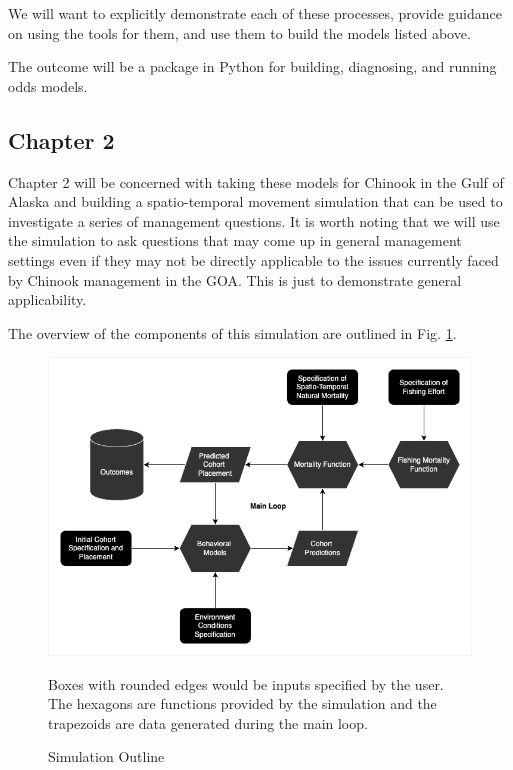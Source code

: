 \documentclass[11pt]{article}
\begin{document}
We will want to explicitly demonstrate each of these processes, provide guidance on using the tools for them, and use them to build the models listed above. \newline

The outcome will be a package in Python for building, diagnosing, and running odds models.

\subsection{Chapter 2}

Chapter 2 will be concerned with taking these models for Chinook in the Gulf of Alaska and building a spatio-temporal movement simulation that can be used to investigate a series of management questions. It is worth noting that we will use the simulation to ask questions that may come up in general management settings even if they may not be directly applicable to the issues currently faced by Chinook management in the GOA. This is just to demonstrate general applicability. \newline

The overview of the components of this simulation are outlined in Fig. \ref{fig:simulation}. 

\begin{figure}[h!] 
  \includegraphics[width=\linewidth]{simulation.png}
  \caption{Simulation Outline}
  \medskip
	\small
	Boxes with rounded edges would be inputs specified by the user. The hexagons are functions 		provided by the simulation and the trapezoids are data generated during the main loop. 
  \label{fig:simulation}
\end{figure}
\end{document}

